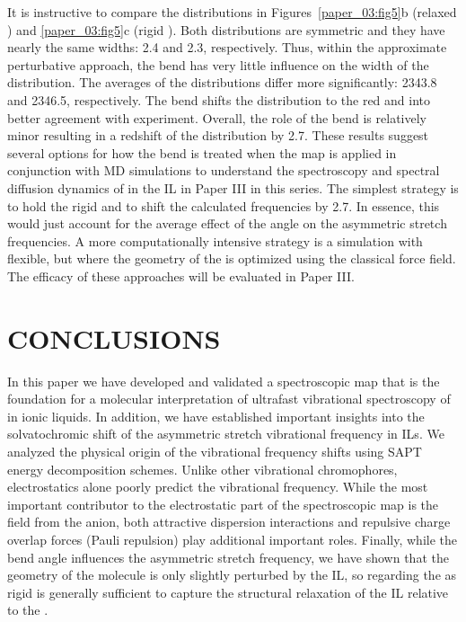 \documentclass[%
  class = book,%
  crop = false,%
  float = true,%
  multi = true,%
  preview = false,%
]{standalone}
\let\cite\autocite
\newcommand{\caps}[1]{\uppercase{#1}}
\begin{document}
It is instructive to compare the distributions in Figures~\ref{paper_03:fig5}b (relaxed ) and \ref{paper_03:fig5}c (rigid ). Both distributions are symmetric and they have nearly the same widths: \SI{2.4}{\wavenumber} and \SI{2.3}{\wavenumber}, respectively. Thus, within the approximate perturbative approach, the bend has very little influence on the width of the distribution. The averages of the distributions differ more significantly: \SI{2343.8}{\wavenumber} and \SI{2346.5}{\wavenumber}, respectively. The bend shifts the distribution to the red and into better agreement with experiment. Overall, the role of the bend is relatively minor resulting in a redshift of the distribution by \SI{2.7}{\wavenumber}. These results suggest several options for how the bend is treated when the map is applied in conjunction with MD simulations to understand the spectroscopy and spectral diffusion dynamics of  in the \ce{[C4C1im][PF6]} IL in Paper III\cite{Brinzer2018} in this series. The simplest strategy is to hold the  rigid and to shift the calculated frequencies by \SI{2.7}{\wavenumber}. In essence, this would just account for the average effect of the  angle on the asymmetric stretch frequencies. A more computationally intensive strategy is a simulation with  flexible, but where the geometry of the  is optimized using the classical force field. The efficacy of these approaches will be evaluated in Paper III\cite{Brinzer2018}.

\section{\texorpdfstring{\caps{Conclusions}}{Conclusions}}
\label{paper_03:sec:VI}

In this paper we have developed and validated a spectroscopic map that is the foundation for a molecular interpretation of ultrafast vibrational spectroscopy of  in ionic liquids. In addition, we have established important insights into the solvatochromic shift of the  asymmetric stretch vibrational frequency in ILs. We analyzed the physical origin of the vibrational frequency shifts using SAPT energy decomposition schemes. Unlike other vibrational chromophores, electrostatics alone poorly predict the vibrational frequency. While the most important contributor to the electrostatic part of the spectroscopic map is the field from the anion, both attractive dispersion interactions and repulsive charge overlap forces (Pauli repulsion) play additional important roles. Finally, while the  bend angle influences the asymmetric stretch frequency, we have shown that the geometry of the  molecule is only slightly perturbed by the IL, so regarding the  as rigid is generally sufficient to capture the structural relaxation of the IL relative to the .
\end{document}
